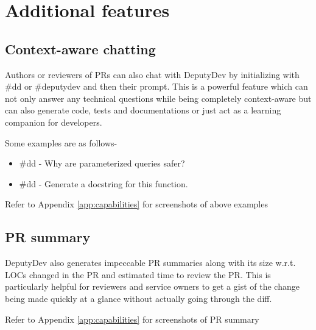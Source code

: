 \section{Additional features}

\subsection{Context-aware chatting}
Authors or reviewers of PRs can also chat with DeputyDev by initializing with \#dd or \#deputydev and then their prompt. This is a powerful feature which can not only answer any technical questions while being completely context-aware but can also generate code, tests and documentations or just act as a learning companion for developers.

Some examples are as follows-
\begin{itemize}
    \item \#dd - Why are parameterized queries safer?
    \item \#dd - Generate a docstring for this function.
\end{itemize}

Refer to Appendix \ref{app:capabilities} for screenshots of above examples

\subsection{PR summary}
DeputyDev also generates impeccable PR summaries along with its size w.r.t. LOCs changed in the PR and estimated time to review the PR. This is particularly helpful for reviewers and service owners to get a gist of the change being made quickly at a glance without actually going through the diff.

Refer to Appendix \ref{app:capabilities} for screenshots of PR summary
